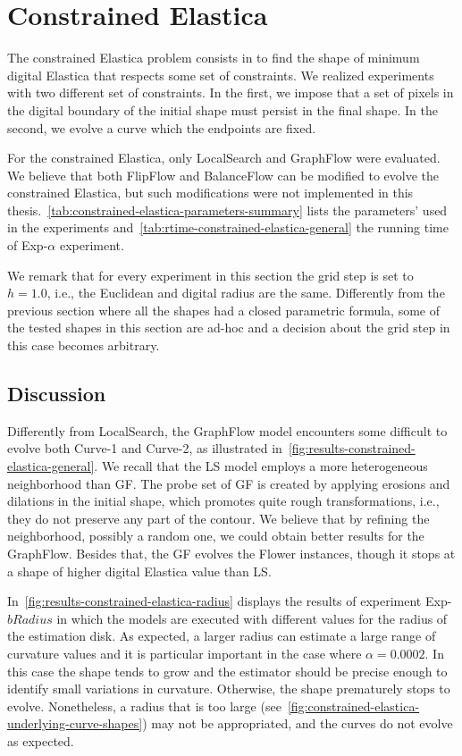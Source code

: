 \section{Constrained Elastica}

The constrained Elastica problem consists in to find the shape of minimum digital Elastica that respects some set of constraints. We realized experiments with two different set of constraints. In the first, we impose that a set of pixels in the digital boundary of the initial shape must persist in the final shape. In the second, we evolve a curve which the endpoints are fixed. 

For the constrained Elastica, only LocalSearch and GraphFlow were evaluated. We believe that both FlipFlow and BalanceFlow can be modified to evolve the constrained Elastica, but such modifications were not implemented in this thesis.~\cref{tab:constrained-elastica-parameters-summary} lists the parameters' used in the experiments and~\cref{tab:rtime-constrained-elastica-general} the running time of Exp-$\alpha$ experiment.

We remark that for every experiment in this section the grid step is set to $h=1.0$, i.e., the Euclidean and digital radius are the same. Differently from the previous section where all the shapes had a closed parametric formula, some of the tested shapes in this section are ad-hoc and a decision about the grid step in this case becomes arbitrary.

\subsection{Discussion}

Differently from LocalSearch, the GraphFlow model encounters some difficult to evolve both Curve-1 and Curve-2, as illustrated in~\cref{fig:results-constrained-elastica-general}. We recall that the LS model employs a more heterogeneous neighborhood than GF. The probe set of GF is created by applying erosions and dilations in the initial shape, which promotes quite rough transformations, i.e., they do not preserve any part of the contour. We believe that by refining the neighborhood, possibly a random one, we could obtain better results for the GraphFlow. Besides that, the GF evolves the Flower instances, though it stops at a shape of higher digital Elastica value than LS.

In~\cref{fig:results-constrained-elastica-radius} displays the results of experiment Exp-$bRadius$ in which the models are executed with different values for the radius of the estimation disk. As expected, a larger radius can estimate a large range of curvature values and it is particular important in the case where $\alpha=0.0002$. In this case the shape tends to grow and the estimator should be precise enough to identify small variations in curvature. Otherwise, the shape prematurely stops to evolve. Nonetheless, a radius that is too large (see~\cref{fig:constrained-elastica-underlying-curve-shapes}) may not be appropriated, and the curves do not evolve as expected.


